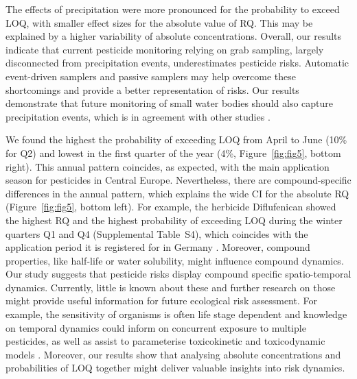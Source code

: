 \documentclass[journal=esthag,manuscript=article]{achemso}
\begin{document}
The effects of precipitation were more pronounced for the probability to exceed LOQ, with smaller effect sizes for the absolute value of RQ. 
This may be explained by a higher variability of absolute concentrations.
Overall, our results indicate that current pesticide monitoring relying on grab sampling, largely disconnected from precipitation events, underestimates pesticide risks.
Automatic event-driven samplers \citep{stehle_probabilistic_2013} and passive samplers \citep{fernandez_calibration_2014,moschet_evaluation_2015} may help overcome these shortcomings and provide a better representation of risks.
Our results demonstrate that future monitoring of small water bodies should also capture precipitation events, which is in agreement with other studies \citet{lorenz_specifics_2016}. 

We found the highest the probability of exceeding LOQ from April to June (10\% for Q2) and lowest in the first quarter of the year (4\%, Figure~\ref{fig:fig5}, bottom right).
This annual pattern coincides, as expected, with the main application season for pesticides in Central Europe.
Nevertheless, there are compound-specific differences in the annual pattern, which explains the wide CI for the absolute RQ (Figure~\ref{fig:fig5}, bottom left). 
For example, the herbicide Diflufenican showed the highest RQ and the highest probability of exceeding LOQ during the winter quarters Q1 and Q4 (Supplemental Table~S4), which coincides with the application period it is registered for in Germany \citep{bvl_online_2016}.
Moreover, compound properties, like half-life or water solubility, might influence compound dynamics. 
Our study suggests that pesticide risks display compound specific spatio-temporal dynamics. 
Currently, little is known about these and further research on those might provide useful information for future ecological risk assessment. 
For example, the sensitivity of organisms is often life stage dependent \citep{hutchinson1998analysis} and knowledge on temporal dynamics could inform on concurrent exposure to multiple pesticides, as well as assist to parameterise toxicokinetic and toxicodynamic models \citep{ashauer2016modelling}. 
Moreover, our results show that analysing absolute concentrations and probabilities of LOQ together might deliver valuable insights into risk dynamics.
\end{document}

